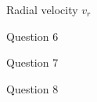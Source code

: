 \documentclass[12pt]{extarticle}
\begin{document}
\begin{center}
Radial velocity $v_r$
\end{center}


\begin{center}
Question 6
\end{center}


\begin{center}
Question 7
\end{center}


\begin{center}
Question 8
\end{center}

\end{document}
